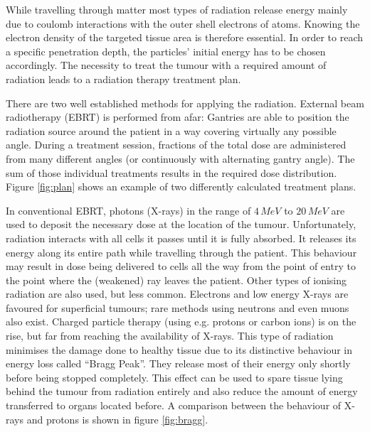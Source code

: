 While travelling through matter most types of radiation release energy mainly due to coulomb interactions with the outer shell electrons of atoms.
Knowing the electron density of the targeted tissue area is therefore essential.
In order to reach a specific penetration depth, the particles' initial energy has to be chosen accordingly.
The necessity to treat the tumour with a required amount of radiation leads to a radiation therapy treatment plan.

There are two well established methods for applying the radiation.
External beam radiotherapy (EBRT) is performed from afar:
Gantries are able to position the radiation source around the patient in a way covering virtually any possible angle.
During a treatment session, fractions of the total dose are administered from many different angles (or continuously with alternating gantry angle).
The sum of those individual treatments results in the required dose distribution.
Figure \ref{fig:plan} shows an example of two differently calculated treatment plans.

In conventional EBRT, photons (X-rays) in the range of $4\, MeV$ to $20\, MeV$ are used to deposit the necessary dose at the location of the tumour.
Unfortunately, radiation interacts with all cells it passes until it is fully absorbed.
It releases its energy along its entire path while travelling through the patient.
This behaviour may result in dose being delivered to cells all the way from the point of entry to the point where the (weakened) ray leaves the patient.
Other types of ionising radiation are also used, but less common.
Electrons and low energy X-rays are favoured for superficial tumours; rare methods using neutrons and even muons also exist.
Charged particle therapy (using e.g. protons or carbon ions) is on the rise, but far from reaching the availability of X-rays.
This type of radiation minimises the damage done to healthy tissue due to its distinctive behaviour in energy loss called ``Bragg Peak''.
They release most of their energy only shortly before being stopped completely.
\cite{Nakamura2010} This effect can be used to spare tissue lying behind the tumour from radiation entirely and also reduce the amount of energy transferred to organs located before. \cite{Paganetti2005}
A comparison between the behaviour of X-rays and protons is shown in figure \ref{fig:bragg}.\\

